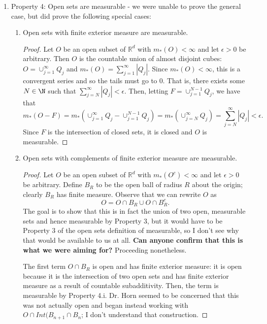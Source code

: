 \documentclass[letterpaper]{article}
\begin{document}
\begin{enumerate}
\begin{enumerate}[label=(\alph*)]
\begin{proof}
    Thus showing $E$ is measurable.
    \end{proof}
    \item{} Property 4: Open sets are measurable - we were unable to prove the general case, but did prove the following special cases:
    \begin{enumerate}[label=\roman*]
        \item{}Open sets with finite exterior measure are measurable.
        \begin{proof}
            Let $O$ be an open subset of $\mathbb{R}^d$ with $m_*(O) < \infty$ and let $\epsilon >0$ be arbitrary. Then $O$ is the countable union of almost disjoint cubes: $O = \cup_{j=1}^\infty Q_j$ and $m_*(O) = \sum_{j=1}^\infty |Q_j|$. Since $m_*(O) < \infty$, this is a convergent series and so the tails must go to 0. That is, there exists some $N \in {\N}$ such that $\sum_{j=N}^\infty |Q_j| < \epsilon$. Then, letting $F = \cup_{j=1}^{N-1} Q_j$, we have that $$m_*(O-F) = m_*( \cup_{j=1}^{\infty} Q_j - \cup_{j=1}^{N-1} Q_j ) = m_*(\cup_{j=N}^\infty Q_j) =  \sum_{j=N}^\infty |Q_j| < \epsilon.$$ Since $F$ is the intersection of closed sets, it is closed and $O$ is measurable.


            \end{proof}
        \item{} Open sets with complements of finite exterior measure are measurable.
        \begin{proof}
         Let $O$ be an open subset of $\mathbb{R}^d$ with $m_*(O^c) < \infty$ and let $\epsilon >0$ be arbitrary. Define $B_R$ to be the open ball of radius $R$ about the origin; clearly $B_R$ has finite measure. Observe that we can rewrite $O$ as $$ O = O\cap B_R \cup O \cap B_R^c.$$ The goal is to show that this is in fact the union of two open, measurable sets and hence measurable by Property 3, but it would have to be Property 3 of the open sets definition of measurable, so I don't see why that would be available to us at all. \textbf{Can anyone confirm that this is what we were aiming for?} Proceeding nonetheless.

         The first term $O \cap B_R$ is open and has finite exterior measure: it is open because it is the intersection of two open sets and has finite exterior measure as a result of countable subadditivity. Then, the term is measurable by Property 4.i. Dr. Horn seemed to be concerned that this was not actually open and began instead working with $O \cap Int(B_{n+1} \cap B_n$; I don't understand that construction.


\end{proof}
\end{enumerate}
\end{enumerate}
\end{enumerate}
\end{document}
